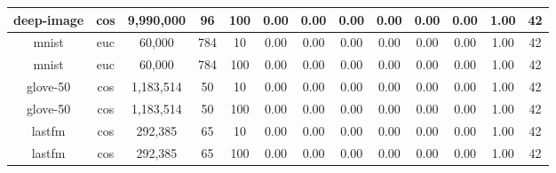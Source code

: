 \begin{table*}[!t]
\begin{center}
\begin{small}
\begin{sc}
\begin{tabular}{|c|c|c|c|c|c|c|c|c|c|c|c|c|}
    \hline
    deep-image       & cos              & 9,990,000	         & 96             & 100         & 0.00 & 0.00                           & 0.00 & 0.00                                & 0.00 & 0.00                                                    & 1.00 & 42 \\
    \hline
    mnist            & euc              & 60,000             & 784             & 10          & 0.00 & 0.00                          & 0.00 & 0.00                                 & 0.00 & 0.00                                                    & 1.00 & 42 \\
    \hline
    mnist            & euc              & 60,000             & 784             & 100         & 0.00 & 0.00                          & 0.00 & 0.00                                  & 0.00 & 0.00                                                    & 1.00 & 42 \\
    \hline
    glove-50         & cos              & 1,183,514          & 50             & 10          & 0.00 & 0.00                           & 0.00 & 0.00                              & 0.00 & 0.00                                                    & 1.00 & 42 \\
    \hline
    glove-50         & cos              & 1,183,514          & 50             & 100         & 0.00 & 0.00                           & 0.00 & 0.00                              & 0.00 & 0.00                                                    & 1.00 & 42 \\
    \hline
    lastfm           & cos              & 292,385            & 65             & 10          & 0.00 & 0.00                           & 0.00 & 0.00                               & 0.00 & 0.00                                                    & 1.00 & 42 \\
    \hline
    lastfm           & cos              & 292,385            & 65             & 100         & 0.00 & 0.00                           & 0.00 & 0.00                             & 0.00 & 0.00                                                    & 1.00 & 42 \\
    \hline
    \end{tabular}
    \end{sc}
    \end{small}
    \end{center}
    \vskip -0.1in
    \end{table*}
    